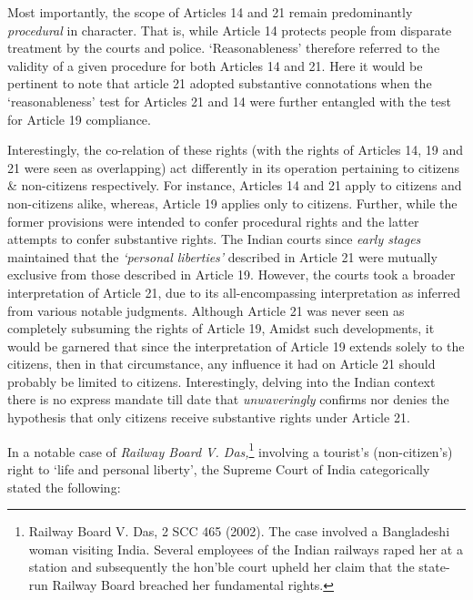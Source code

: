 \begin{multicols}{2}
\vspace{-.1cm}

\noi
Most importantly, the scope of Articles 14 and 21 remain predominantly \textit{procedural} in
character. That is, while Article 14 protects people from disparate treatment by the courts and
police. `Reasonableness' therefore referred to the validity of a given procedure for both
Articles 14 and 21. Here it would be pertinent to note that article 21 adopted substantive
connotations when the `reasonableness' test for Articles 21 and 14 were further entangled with
the test for Article 19 compliance.

\vspace{-.2cm}

\noi
Interestingly, the co-relation of these rights (with the rights of Articles 14, 19 and 21 were
seen as overlapping) act differently in its operation pertaining to citizens \& non-citizens
respectively. For instance, Articles 14 and 21 apply to citizens and non-citizens alike, whereas, Article 19 applies only to citizens. Further, while the former provisions were
intended to confer procedural rights and the latter attempts to confer substantive rights.
The Indian courts since \textit{early stages} maintained that the \textit{`personal liberties'} described in
Article 21 were mutually exclusive from those described in Article 19. However, the courts
took a broader interpretation of Article 21, due to its all-encompassing interpretation as
inferred from various notable judgments. Although Article 21 was never seen as completely
subsuming the rights of Article 19, Amidst such developments, it would be garnered that
since the interpretation of Article 19 extends solely to the citizens, then in that circumstance,
any influence it had on Article 21 should probably be limited to citizens. Interestingly,
delving into the Indian context there is no express mandate till date that \textit{unwaveringly}
confirms nor denies the hypothesis that only citizens receive substantive rights under Article
21.

\noi
In a notable case of \textit{Railway Board V. Das,}\footnote{Railway Board V. Das, 2 SCC 465 (2002). The case involved a Bangladeshi woman visiting India. Several employees of the Indian railways raped her at a station and subsequently the hon’ble court upheld her claim that the state-run Railway Board breached her fundamental rights.} involving a tourist's (non-citizen's) right to `life and personal liberty', the Supreme Court of India categorically stated the following:


\end{multicols}
